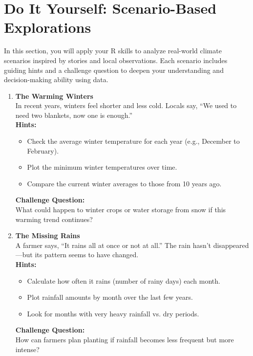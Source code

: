 \section*{Do It Yourself: Scenario-Based Explorations}

In this section, you will apply your R skills to analyze real-world climate scenarios inspired by stories and local observations. Each scenario includes guiding hints and a challenge question to deepen your understanding and decision-making ability using data.

\begin{enumerate}

  \item \textbf{The Warming Winters} \\
  In recent years, winters feel shorter and less cold. Locals say, “We used to need two blankets, now one is enough.” \\
  \textbf{Hints:}
  \begin{itemize}
    \item Check the average winter temperature for each year (e.g., December to February).
    \item Plot the minimum winter temperatures over time.
    \item Compare the current winter averages to those from 10 years ago.
  \end{itemize}
  \textbf{Challenge Question:} \\
  What could happen to winter crops or water storage from snow if this warming trend continues?

  \item \textbf{The Missing Rains} \\
  A farmer says, “It rains all at once or not at all.” The rain hasn’t disappeared—but its pattern seems to have changed. \\
  \textbf{Hints:}
  \begin{itemize}
    \item Calculate how often it rains (number of rainy days) each month.
    \item Plot rainfall amounts by month over the last few years.
    \item Look for months with very heavy rainfall vs. dry periods.
  \end{itemize}
  \textbf{Challenge Question:} \\
  How can farmers plan planting if rainfall becomes less frequent but more intense?


\end{enumerate}
